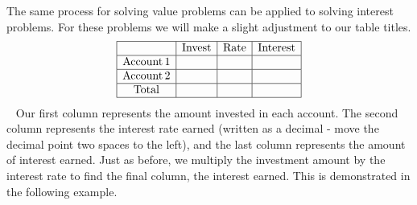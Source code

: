 The same process for solving value problems can be applied to solving interest
problems.  For these problems we will make a slight adjustment to our table titles.\pp
\[ \begin{array}{|c|c|c|c|}
     \hline
     & \operatorname{Invest} & \operatorname{Rate} & \operatorname{Interest}\\
     \hline
     \operatorname{Account} 1 &  &  & \\
     \hline
     \operatorname{Account} 2 &  &  & \\
     \hline
     \operatorname{Total} &  &  & \\
     \hline
   \end{array} \]
	~\pp
Our first column represents the amount invested in each account. The second column
represents the interest rate earned (written as a decimal - move the decimal point two spaces to the left), and the last column represents the amount of interest earned. Just as
before, we multiply the investment amount by the interest rate to find the final
column, the interest earned. This is demonstrated in the following example.


